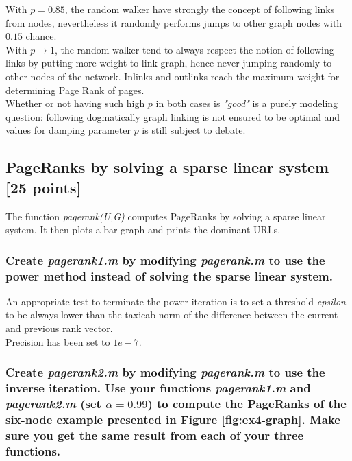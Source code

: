 \documentclass[unicode,11pt,a4paper,oneside,numbers=endperiod,openany]{scrartcl}
\begin{document}
\begin{enumerate}
          With $p = 0.85$, the random walker have strongly the concept of following links from nodes, nevertheless it randomly performs jumps to other graph nodes with $0.15$ chance. \\

          With $p \rightarrow 1$, the random walker tend to always respect the notion of following links by putting more weight to link graph, hence never jumping randomly to other nodes of the network.
          Inlinks and outlinks reach the maximum weight for determining Page Rank of pages.\\

          Whether or not having such high $p$ in both cases is \textit{"good"} is a purely modeling question:
          following dogmatically graph linking is not ensured to be optimal and values for damping parameter $p$ is still subject to debate.

\end{enumerate}

\cleardoublepage

\subsection{PageRanks by solving a sparse linear system [25 points]}
The function \textit{pagerank(U,G)} computes PageRanks by solving a sparse linear system. It then plots a bar graph and prints the dominant URLs.

\subsubsection{Create \textit{pagerank1.m} by modifying \textit{pagerank.m} to use the power method instead of solving the sparse linear system.}

An appropriate test to terminate the power iteration is
to set a threshold \textit{epsilon} to be always lower than
the taxicab norm of the difference between the current and previous rank vector. \\
Precision has been set to $1e-7$.

\subsubsection{Create \textit{pagerank2.m} by modifying \textit{pagerank.m} to use the inverse iteration.
    Use your functions \textit{pagerank1.m} and \textit{pagerank2.m} (set $\alpha = 0.99$)
    to compute the PageRanks of the six-node example presented in Figure \ref{fig:ex4-graph}.
    Make sure you get the same result from each of your three functions.}
\end{document}
